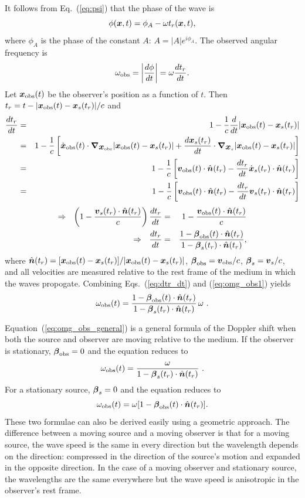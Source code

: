 \documentclass[12pt]{article}
\newcommand \beq {\begin{equation}}
\newcommand \eeq {\end{equation}}
\newcommand \beqn {\begin{eqnarray}}
\newcommand \eeqn {\end{eqnarray}}
\newcommand{\ve}[1]{\mbox{\boldmath $#1$}}
\begin{document}
It follows from Eq.~(\ref{eq:psi}) that the phase of the wave is 
\beq
  \phi(\ve{x},t) = \phi_A - \omega t_r(\ve{x},t) ,
\eeq
where $\phi_A$ is the phase of the constant $A$: $A=|A|e^{i\phi_A}$.
The observed angular frequency is 
\beq
  \omega_{\rm obs} = \left| \frac{d\phi}{dt}\right| = \omega \frac{dt_r}{dt} .
\label{eq:omg_obs1}
\eeq
Let $\ve{x}_{\rm obs}(t)$ be the observer's position as a function of $t$. 
Then $t_r = t-|\ve{x}_{\rm obs}(t)-\ve{x}_s(t_r)|/c$ and 
\beqn
  \frac{dt_r}{dt} &=& 1 - \frac{1}{c} \frac{d}{dt} |\ve{x}_{\rm obs}(t)-\ve{x}_s(t_r)| \\ 
&=& 1-\frac{1}{c} \left[ \dot{\ve{x}}_{\rm obs}(t) \cdot \ve{\nabla}_{\ve{x}_{\rm obs}}|\ve{x}_{\rm obs}(t)-\ve{x}_s(t_r)| 
+ \frac{d \ve{x}_s(t_r)}{dt} \cdot \ve{\nabla}_{\ve{x}_s} |\ve{x}_{\rm obs}(t)-\ve{x}_s(t_r)| 
\right] \\ 
&=& 1 - \frac{1}{c} \left[ \ve{v}_{\rm obs}(t) \cdot \hat{\ve{n}}(t_r) -\frac{dt_r}{dt} \dot{\ve{x}}_s(t_r) \cdot \hat{\ve{n}}(t_r)\right] \\ 
&=& 1 - \frac{1}{c} \left[ \ve{v}_{\rm obs}(t) \cdot \hat{\ve{n}}(t_r) 
- \frac{dt_r}{dt} \ve{v}_s(t_r) \cdot \hat{\ve{n}}(t_r) \right] 
\eeqn
\beqn
\Rightarrow \ \ \left(1-\frac{\ve{v}_s(t_r) \cdot \hat{\ve{n}}(t_r)}{c}\right)\frac{dt_r}{dt} 
&=& 1- \frac{\ve{v}_{\rm obs}(t) \cdot \hat{\ve{n}}(t_r)}{c}  \\ 
\Rightarrow \ \ 
\frac{dt_r}{dt} &=& \frac{1-\ve{\beta}_{\rm obs}(t) \cdot \hat{\ve{n}}(t_r)}
{1-\ve{\beta}_s(t_r) \cdot \hat{\ve{n}}(t_r)} ,
\label{eq:dtr_dt}
\eeqn
where $\hat{\ve{n}}(t_r) = [\ve{x}_{\rm obs}(t)-\ve{x}_s(t_r)]/|\ve{x}_{\rm obs}(t)-\ve{x}_s(t_r)|$, 
$\ve{\beta}_{\rm obs}=\ve{v}_{\rm obs}/c$, $\ve{\beta}_s=\ve{v}_s/c$, 
and all velocities are measured relative to the rest frame of the medium in which 
the waves propogate. Combining Eqs.~(\ref{eq:dtr_dt}) and (\ref{eq:omg_obs1}) yields 
\beq
\omega_{\rm obs}(t) = \frac{1-\ve{\beta}_{\rm obs}(t) \cdot \hat{\ve{n}}(t_r)}
{1-\ve{\beta}_s(t_r) \cdot \hat{\ve{n}}(t_r)}\, \omega \ .
\label{eq:omg_obs_general}
\eeq

Equation~(\ref{eq:omg_obs_general}) is a general formula of the Doppler shift 
when both the source and observer are moving relative to the medium. 
If the observer is stationary, 
$\ve{\beta}_{\rm obs}=0$ and the equation reduces to 
\beq
  \omega_{\rm obs}(t) = \frac{\omega}{1-\ve{\beta}_s(t_r) \cdot \hat{\ve{n}}(t_r)} \ .
\label{eq:Doppler_moving_source}
\eeq
For a stationary source, $\ve{\beta}_s=0$ and the equation reduces to 
\beq
  \omega_{\rm obs}(t) = \omega [1-\ve{\beta}_{\rm obs}(t) \cdot \hat{\ve{n}}(t_r)] .
\label{eq:Doppler_moving_observer}
\eeq
These two formulae can also be derived easily using a geometric approach. 
The difference between a moving source and a moving observer is that for a 
moving source, the wave speed is the same in every direction but the wavelength 
depends on the direction: compressed in the direction of the source's motion 
and expanded in the opposite direction. In the case of a moving observer and 
stationary source, the wavelengths are the same everywhere but the wave speed 
is anisotropic in the observer's rest frame.
\end{document}
